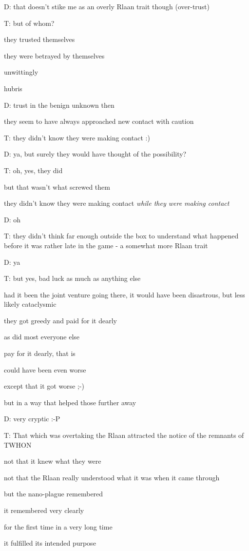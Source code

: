 D: that doesn't stike me as an overly Rlaan trait though (over-trust)

T: but of whom?

they trusted themselves

they were betrayed by themselves

unwittingly

hubris

D: trust in the benign unknown then

they seem to have always approached new contact with caution

T: they didn't know they were making contact :)

D: ya, but surely they would have thought of the possibility?

T: oh, yes, they did

but that wasn't what screwed them

they didn't know they were making contact {\em while they were making contact}

D: oh

T: they didn't think far enough outside the box to understand what happened before it was rather late in the game - a somewhat more Rlaan trait

D: ya

T: but yes, bad luck as much as anything else

had it been the joint venture going there, it would have been disastrous, but less likely cataclysmic

they got greedy and paid for it dearly

as did most everyone else

pay for it dearly, that is

could have been even worse

except that it got worse ;-)

but in a way that helped those further away

D: very cryptic :-P

T: That which was overtaking the Rlaan attracted the notice of the remnants of TWHON

not that it knew what they were

not that the Rlaan really understood what it was when it came through

but the nano-plague remembered

it remembered very clearly

for the first time in a very long time

it fulfilled its intended purpose

